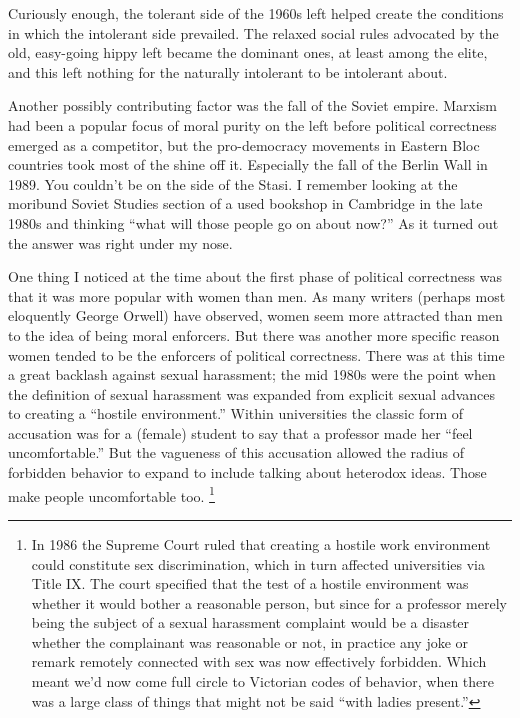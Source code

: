 \documentclass[12pt]{book}
\begin{document}
Curiously enough, the tolerant side of the 1960s left helped create the
conditions in which the intolerant side prevailed. The relaxed social
rules advocated by the old, easy-going hippy left became the dominant
ones, at least among the elite, and this left nothing for the naturally
intolerant to be intolerant about.

Another possibly contributing factor was the fall of the Soviet empire.
Marxism had been a popular focus of moral purity on the left before
political correctness emerged as a competitor, but the pro-democracy
movements in Eastern Bloc countries took most of the shine off it.
Especially the fall of the Berlin Wall in 1989. You couldn't be on the
side of the Stasi. I remember looking at the moribund Soviet Studies
section of a used bookshop in Cambridge in the late 1980s and thinking
``what will those people go on about now?'' As it turned out the answer
was right under my nose.

One thing I noticed at the time about the first phase of political
correctness was that it was more popular with women than men. As many
writers (perhaps most eloquently George Orwell) have observed, women
seem more attracted than men to the idea of being moral enforcers. But
there was another more specific reason women tended to be the enforcers
of political correctness. There was at this time a great backlash
against sexual harassment; the mid 1980s were the point when the
definition of sexual harassment was expanded from explicit sexual
advances to creating a ``hostile environment.'' Within universities the
classic form of accusation was for a (female) student to say that a
professor made her ``feel uncomfortable.'' But the vagueness of this
accusation allowed the radius of forbidden behavior to expand to include
talking about heterodox ideas. Those make people uncomfortable too.
\footnote{In 1986 the Supreme Court ruled that creating a hostile work
environment could constitute sex discrimination, which in turn affected
universities via Title IX. The court specified that the test of a
hostile environment was whether it would bother a reasonable person, but
since for a professor merely being the subject of a sexual harassment
complaint would be a disaster whether the complainant was reasonable or
not, in practice any joke or remark remotely connected with sex was now
effectively forbidden. Which meant we'd now come full circle to
Victorian codes of behavior, when there was a large class of things that
might not be said ``with ladies present.''}
\end{document}
